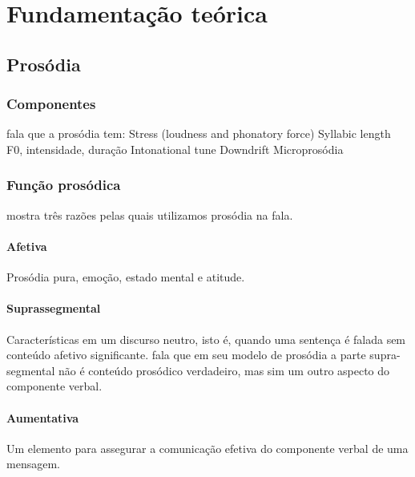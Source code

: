 
\chapter{Fundamentação teórica}

\section{Prosódia}
\subsection{Componentes}
 fala que a prosódia tem:
Stress (loudness and phonatory force)
Syllabic length
F0, intensidade, duração
Intonational tune
Downdrift
Microprosódia
\subsection{Função prosódica}
 mostra três razões pelas quais utilizamos prosódia na fala.
\subsubsection{Afetiva}
Prosódia pura, emoção, estado mental e atitude. 
\subsubsection{Suprassegmental}
Características em um discurso neutro, isto é, quando uma sentença é falada sem
conteúdo afetivo significante.  fala que em seu modelo de
prosódia a parte supra-segmental não é conteúdo prosódico verdadeiro, mas sim
um outro aspecto do componente verbal.
\subsubsection{Aumentativa}
Um elemento para assegurar a comunicação efetiva do componente verbal de uma mensagem.
